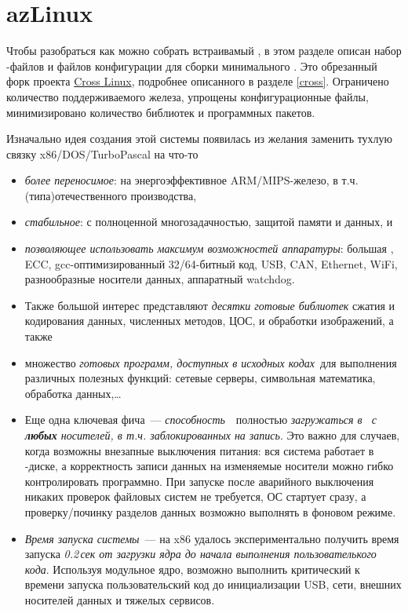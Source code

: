 \chapter{azLinux}

Чтобы разобраться как можно собрать встраивамый \linux, в этом разделе описан
набор \make-файлов и файлов конфигурации для сборки минимального \emlinux.
Это обрезанный форк проекта \href{https://github.com/user/cross}{Cross
Linux}, подробнее описанного в разделе \ref{cross}. Ограничено количество
поддерживаемого железа, упрощены конфигурационные файлы, минимизировано
количество библиотек и программных пакетов.

\bigskip

Изначально идея создания этой системы появилась из желания заменить тухлую
связку x86/DOS/Tur\-bo\-Pas\-cal на что-то

\begin{itemize}
  \item \emph{более переносимое}: на
 энергоэффективное ARM/MIPS-железо, в т.ч. (типа)отечественного производства,
\item \emph{стабильное}: с полноценной многозадачностью,
защитой памяти и данных, и
\item \emph{позволяющее использовать максимум возможностей аппаратуры}: большая
\ram, ECC, gcc-оп\-ти\-ми\-зи\-ро\-ван\-ный 32/64-битный код, USB, CAN, Ethernet,
WiFi, разнообразные носители данных, аппаратный watchdog.
 
\item Также большой интерес представляют \emph{десятки готовые библиотек} сжатия
и кодирования данных, численных методов, ЦОС, и обработки изображений, а также

\item множество \emph{готовых программ, доступных в исходных кодах}\ для выполнения различных полезных функций: сетевые серверы,
символьная математика, обработка данных,\ldots

\item Еще одна ключевая фича\ --- \emph{способность}\ \linux\ полностью
\emph{загружаться в \ram\ с \textbf{любых} носителей, в т.ч. заблокированных на
запись}. Это важно для случаев, когда возможны внезапные выключения питания:
вся система работает в \ram-диске, а корректность записи данных на изменяемые
носители можно гибко контролировать программно. При запуске после аварийного
выключения никаких проверок файловых систем не требуется, ОС стартует сразу, а
проверку/починку разделов данных возможно выполнять в фоновом режиме.

\item \emph{Время запуска системы}\ --- на x86 удалось экспериментально получить
время запуска \emph{0.2\,сек от загрузки ядра до начала выполнения
пользователького кода}.
Используя модульное ядро, возможно выполнить критический к времени запуска
пользовательский код до инициализации USB, сети, внешних носителей данных и
тяжелых сервисов.

\end{itemize}

